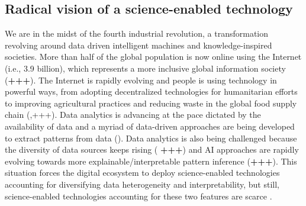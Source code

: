 \documentclass[11pt, a4paper]{article} %
\begin{document}
\subsection{Radical vision of a science-enabled technology}
We are in the midst of the fourth industrial revolution, a
transformation revolving around data driven intelligent machines and
knowledge-inspired societies. More than half of the global population
is now online using the Internet (i.e., 3.9 billion), which represents
a more inclusive global information society ({\bf +++}). The Internet
is rapidly evolving and people is using technology in powerful ways,
from adopting decentralized technologies for humanitarian efforts to
improving agricultural practices and reducing waste in the global food
supply chain (\citep{Wilson2018},+++). Data analytics is advancing at
the pace dictated by the availability of data and a myriad of
data-driven approaches are being developed to extract patterns from
data (\citep{Schmidhuber:2015}). Data analytics is also being
challenged because the diversity of data sources keeps rising ({\bf
  +++}) and AI approaches are rapidly evolving towards more
explainable/interpretable pattern inference ({\bf +++}). This
situation forces the digital ecosystem to deploy science-enabled
technologies accounting for diversifying data heterogeneity and
interpretability, but still, science-enabled technologies accounting
for these two features are scarce \citep{RePEc}.
  
\end{document}
